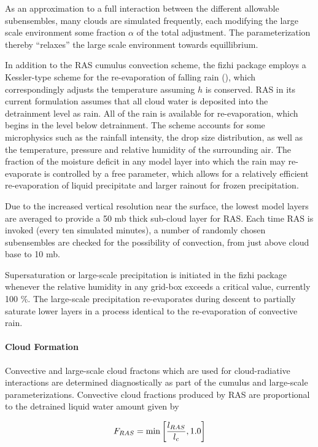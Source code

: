 As an approximation to a full interaction between the different allowable subensembles,
many clouds are simulated frequently, each modifying the large scale environment some fraction
$\alpha$ of the total adjustment. The parameterization thereby ``relaxes'' the large scale environment
towards equillibrium.  

In addition to the RAS cumulus convection scheme, the fizhi package employs a
Kessler-type scheme for the re-evaporation of falling rain (\cite{sudm:88}), which
correspondingly adjusts the temperature assuming $h$ is conserved. RAS in its current
formulation assumes that all cloud water is deposited into the detrainment level as rain.
All of the rain is available for re-evaporation, which begins in the level below detrainment. 
The scheme accounts for some microphysics such as
the rainfall intensity, the drop size distribution, as well as the temperature, 
pressure and relative humidity of the surrounding air.  The fraction of the moisture deficit 
in any model layer into which the rain may re-evaporate is controlled by a free parameter,
which allows for a relatively efficient re-evaporation of liquid precipitate and larger rainout
for frozen precipitation.

Due to the increased vertical resolution near the surface, the lowest model 
layers are averaged to provide a 50 mb thick sub-cloud layer for RAS.  Each time RAS is
invoked (every ten simulated minutes), 
a number of randomly chosen subensembles are checked for the possibility 
of convection, from just above cloud base to 10 mb.  

Supersaturation or large-scale precipitation is initiated in the fizhi package whenever 
the relative humidity in any grid-box exceeds a critical value, currently 100 \%.
The large-scale precipitation re-evaporates during descent to partially saturate 
lower layers in a process identical to the re-evaporation of convective rain. 

 
\paragraph{Cloud Formation}
\label{sec:fizhi:clouds}

Convective and large-scale cloud fractons which are used for cloud-radiative interactions are determined
diagnostically as part of the cumulus and large-scale parameterizations.
Convective cloud fractions produced by RAS are proportional to the 
detrained liquid water amount given by

\[
F_{RAS} = \min\left[ {l_{RAS}\over l_c}, 1.0 \right]
\]


